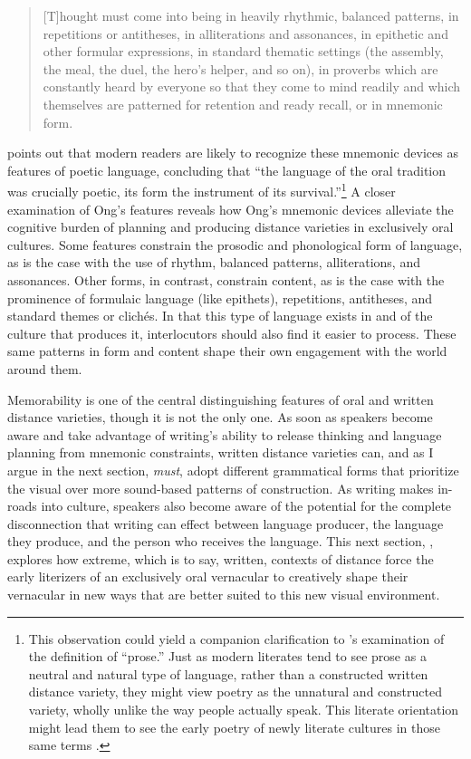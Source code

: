 \begin{quote}{}
[T]hought must come into being in heavily rhythmic, balanced patterns, in repetitions or antitheses, in alliterations and assonances, in epithetic and other formular expressions, in standard thematic settings (the assembly, the meal, the duel, the hero’s helper, and so on), in proverbs which are constantly heard by everyone so that they come to mind readily and which themselves are patterned for retention and ready recall, or in mnemonic form.
\end{quote}

\noindent \citet[33]{Somers2021b} points out that modern readers are likely to recognize these mnemonic devices as features of poetic language, concluding that “the language of the oral tradition was crucially poetic, its form the instrument of its survival.”\footnote{This observation could yield a companion clarification to ’s examination of the definition of “prose.” Just as modern literates tend to see prose as a neutral and natural type of language, rather than a constructed written distance variety, they might view poetry as the unnatural and constructed variety, wholly unlike the way people actually speak. This literate orientation might lead them to see the early poetry of newly literate cultures in those same terms \citep[368--370]{Somers2021a}.} A closer examination of Ong’s features reveals how Ong’s mnemonic devices alleviate the cognitive burden of planning and producing distance varieties in exclusively oral cultures. Some features constrain the prosodic and phonological form of language, as is the case with the use of rhythm, balanced patterns, alliterations, and assonances. Other forms, in contrast, constrain content, as is the case with the prominence of formulaic language (like epithets), repetitions, antitheses, and standard themes or clichés. In that this type of language exists in and of the culture that produces it, interlocutors should also find it easier to process. These same patterns in form and content shape their own engagement with the world around them.

Memorability is one of the central distinguishing features of oral and written distance varieties, though it is not the only one. As soon as speakers become aware and take advantage of writing’s ability to release thinking and language planning from mnemonic constraints, written distance varieties can, and as I argue in the next section, \textit{must}, adopt different grammatical forms that prioritize the visual over more sound-based patterns of construction. As writing makes in-roads into culture, speakers also become aware of the potential for the complete disconnection that writing can effect between language producer, the language they produce, and the person who receives the language. This next section, , explores how extreme, which is to say, written, contexts of distance force the early literizers of an exclusively oral vernacular to creatively shape their vernacular in new ways that are better suited to this new visual environment.

